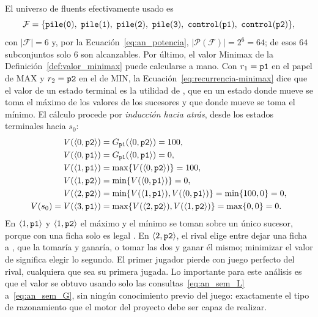 El universo de fluents efectivamente usado es
\begin{equation*}
    \mathcal F = \{\kw{pile}(\kw 0),\ \kw{pile}(\kw 1),\ \kw{pile}(\kw 2),\ \kw{pile}(\kw 3),\ \kw{control}(\kw{p1}),\ \kw{control}(\kw{p2})\},
\end{equation*}
con $|\mathcal F| = 6$ y, por la Ecuación~\eqref{eq:an_potencia}, $|\mathcal P(\mathcal F)| = 2^6 = 64$; de esos $64$ subconjuntos solo $6$ son alcanzables. Por último, el valor Minimax de la Definición~\ref{def:valor_minimax} puede calcularse a mano. Con $r_1 = \texttt{p1}$ en el papel de MAX y $r_2 = \texttt{p2}$ en el de MIN, la Ecuación~\eqref{eq:recurrencia-minimax} dice que el valor de un estado terminal es la utilidad de , que en un estado donde mueve  se toma el máximo de los valores de los sucesores y que donde mueve  se toma el mínimo. El cálculo procede por \emph{inducción hacia atrás}, desde los estados terminales hacia $s_0$:
\begin{align*}
    V(\langle 0,\texttt{p2}\rangle) &= G_{\texttt{p1}}(\langle 0,\texttt{p2}\rangle) = 100,\\
    V(\langle 0,\texttt{p1}\rangle) &= G_{\texttt{p1}}(\langle 0,\texttt{p1}\rangle) = 0,\\
    V(\langle 1,\texttt{p1}\rangle) &= \max\{V(\langle 0,\texttt{p2}\rangle)\} = 100,\\
    V(\langle 1,\texttt{p2}\rangle) &= \min\{V(\langle 0,\texttt{p1}\rangle)\} = 0,\\
    V(\langle 2,\texttt{p2}\rangle) &= \min\{V(\langle 1,\texttt{p1}\rangle), V(\langle 0,\texttt{p1}\rangle)\} = \min\{100, 0\} = 0,\\
    V(s_0) = V(\langle 3,\texttt{p1}\rangle) &= \max\{V(\langle 2,\texttt{p2}\rangle), V(\langle 1,\texttt{p2}\rangle)\} = \max\{0, 0\} = 0.
\end{align*}
En $\langle 1,\texttt{p1}\rangle$ y $\langle 1,\texttt{p2}\rangle$ el máximo y el mínimo se toman sobre un único sucesor, porque con una ficha solo es legal . En $\langle 2,\texttt{p2}\rangle$, el rival elige entre dejar una ficha a , que la tomaría y ganaría, o tomar las dos y ganar él mismo; minimizar el valor de  significa elegir lo segundo. El primer jugador pierde con juego perfecto del rival, cualquiera que sea su primera jugada. Lo importante para este análisis es que el valor se obtuvo usando solo las consultas~\eqref{eq:an_sem_L} a~\eqref{eq:an_sem_G}, sin ningún conocimiento previo del juego: exactamente el tipo de razonamiento que el motor del proyecto debe ser capaz de realizar.

